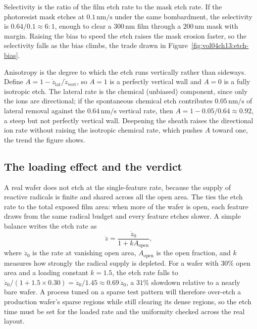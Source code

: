 Selectivity is the ratio of the film etch rate to the mask etch rate. If
the photoresist mask etches at $0.1\,\si{\nano\meter\per\second}$ under the
same bombardment, the selectivity is $0.64/0.1 \approx 6{:}1$, enough to
clear a $300\,\si{\nano\meter}$ film through a $200\,\si{\nano\meter}$ mask
with margin. Raising the bias to speed the etch raises the mask erosion
faster, so the selectivity falls as the bias climbs, the trade drawn in
Figure~\ref{fig:vol04ch13:etch-bias}.

Anisotropy is the degree to which the etch runs vertically rather than
sideways. Define $A = 1 - \dot{z}_{\mathrm{lat}}/\dot{z}_{\mathrm{vert}}$,
so $A = 1$ is a perfectly vertical wall and $A = 0$ is a fully isotropic
etch. The lateral rate is the chemical (unbiased) component, since only the
ions are directional; if the spontaneous chemical etch contributes
$0.05\,\si{\nano\meter\per\second}$ of lateral removal against the
$0.64\,\si{\nano\meter\per\second}$ vertical rate, then $A = 1 - 0.05/0.64
\approx 0.92$, a steep but not perfectly vertical wall. Deepening the sheath
raises the directional ion rate without raising the isotropic chemical rate,
which pushes $A$ toward one, the trend the figure shows.



\subsection{The loading effect and the verdict}

A real wafer does not etch at the single-feature rate, because the supply of
reactive radicals is finite and shared across all the open area. The
 ties the etch rate to the total exposed film area:
when more of the wafer is open, each feature draws from the same radical
budget and every feature etches slower. A simple balance writes the etch
rate as
\[
\dot{z} = \frac{\dot{z}_0}{1 + k A_{\mathrm{open}}},
\]
where $\dot{z}_0$ is the rate at vanishing open area, $A_{\mathrm{open}}$ is
the open fraction, and $k$ measures how strongly the radical supply is
depleted. For a wafer with $30\%$ open area and a loading constant $k =
1.5$, the etch rate falls to $\dot{z}_0/(1 + 1.5\times 0.30) = \dot{z}_0/
1.45 \approx 0.69\,\dot{z}_0$, a $31\%$ slowdown relative to a nearly bare
wafer. A process tuned on a sparse test pattern will therefore over-etch a
production wafer's sparse regions while still clearing its dense regions, so
the etch time must be set for the loaded rate and the uniformity checked
across the real layout.

